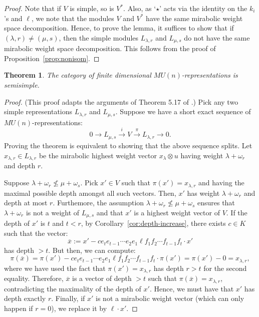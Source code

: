 \documentclass{amsart}
\numberwithin{equation}{section}
\theoremstyle{theorem}
\newtheorem{theorem}{Theorem}[section]
\theoremstyle{definition}
\newcommand{\ol}{\overline}
\newcommand{\ra}{\rightarrow}
\newcommand{\xra}{\xrightarrow[]}
\begin{document}
\begin{proof}
Note that if $V$ is simple, so is $V^*$. Also, as `$\star$' acts via the identity on the $k_i$'s and $\ell$, we note that the modules $V$ and $V^*$ have the same mirabolic weight space decomposition. Hence, to prove the lemma, it suffices to show that if $(\lambda, r)\neq (\mu,s)$, then the simple modules $L_{\lambda,r}$ and $L_{\mu,s}$ do not have the same mirabolic weight space decomposition. This follows from the proof of Proposition~\ref{prop:nonisom}.
\end{proof}

\begin{theorem} \label{thm:ss}
The category of finite dimensional $MU(n)$-representations is semisimple.
\end{theorem}

\begin{proof}
(This proof adapts the arguments of Theorem 5.17 of \cite{J}.) Pick any two simple representations $L_{\lambda,r}$ and $L_{\mu,s}$. Suppose we have a short exact sequence of $MU(n)$-representations:
\[0\ra L_{\mu,s} \xra{i} V \xra{\pi} L_{\lambda,r}\ra 0.\]
Proving the theorem is equivalent to showing that the above sequence splits. Let $x_{\lambda,r} \in L_{\lambda,r}$ be the mirabolic highest weight vector $x_{\lambda}\otimes u$ having weight $\lambda+\omega_r$ and depth $r$.

Suppose $\lambda+\omega_r \not\leq \mu + \omega_s $. Pick $x' \in V$ such that $\pi(x')=x_{\lambda,r}$ and having the maximal possible depth amongst all such vectors. Then, $x'$ has weight $\lambda+\omega_r$ and depth at most $r$. Furthemore, the assumption $\lambda+\omega_r \not\leq \mu + \omega_s $ ensures that $\lambda+\omega_r$ is not a weight of $L_{\mu,s}$ and that $x'$ is a highest weight vector of $V$. If the depth of $x'$ is $t$ and $t<r$, by Corollary~\ref{cor:depth-increase}, there exists $c\in K$ such that the vector:
\[\ol x:= x' - ce_t e_{t-1}\cdots e_2e_1\ell f_1f_2\cdots f_{t-1}f_t\cdot x'\]
has depth $>t$. But then, we can compute:
\[
\pi(\ol x) = \pi(x') - ce_t e_{t-1}\cdots e_2e_1\ell f_1f_2\cdots f_{t-1}f_t\cdot \pi(x') = \pi(x') -0= x_{\lambda,r},
\]
where we have used the fact that $\pi(x')=x_{\lambda,r}$ has depth $r>t$ for the second equality. Therefore, $\ol x$ is a vector of depth $>t$ such that $\pi(\ol x)=x_{\lambda, r}$, contradicting the maximality of the depth of $x'$. Hence, we must have that $x'$ has depth exactly $r$. Finally, if $x'$ is not a mirabolic weight vector (which can only happen if $r=0$), we replace it by $\ell\cdot x'$.


\end{proof}
\end{document}
